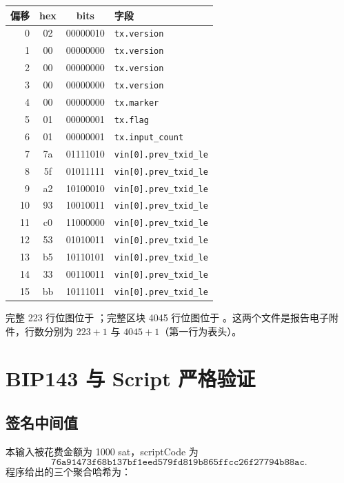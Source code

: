 \documentclass[UTF8,a4paper,zihao=-4]{ctexart}
\begin{document}
\begin{center}
\small
\begin{tabular}{r c c l}
\toprule
偏移 & hex & bits & 字段\\
\midrule
0&02&00000010&\texttt{tx.version}\\
1&00&00000000&\texttt{tx.version}\\
2&00&00000000&\texttt{tx.version}\\
3&00&00000000&\texttt{tx.version}\\
4&00&00000000&\texttt{tx.marker}\\
5&01&00000001&\texttt{tx.flag}\\
6&01&00000001&\texttt{tx.input\_count}\\
7&7a&01111010&\texttt{vin[0].prev\_txid\_le}\\
8&5f&01011111&\texttt{vin[0].prev\_txid\_le}\\
9&a2&10100010&\texttt{vin[0].prev\_txid\_le}\\
10&93&10010011&\texttt{vin[0].prev\_txid\_le}\\
11&c0&11000000&\texttt{vin[0].prev\_txid\_le}\\
12&53&01010011&\texttt{vin[0].prev\_txid\_le}\\
13&b5&10110101&\texttt{vin[0].prev\_txid\_le}\\
14&33&00110011&\texttt{vin[0].prev\_txid\_le}\\
15&bb&10111011&\texttt{vin[0].prev\_txid\_le}\\
\bottomrule
\end{tabular}
\end{center}

完整 223 行位图位于
；完整区块 4045 行位图位于
。这两个文件是报告电子附件，行数分别为 $223+1$ 与 $4045+1$（第一行为表头）。

\section{BIP143 与 Script 严格验证}

\subsection{签名中间值}

本输入被花费金额为 1000 sat，scriptCode 为
\[
\texttt{76a91473f68b137bf1eed579fd819b865ffcc26f27794b88ac}.
\]
程序给出的三个聚合哈希为：
\end{document}
